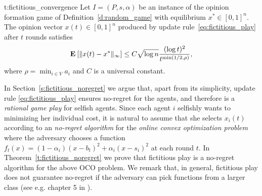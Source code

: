 %
\begin{reptheorem}{t:fictitious_convergence}
  Let $I = (P,s, \alpha)$ be an instance of the opinion formation
  game of Definition~\ref{d:random_game} with equilibrium
  $x^* \in [0,1]^n$.  The opinion vector $x(t)\in[0,1]^n$ produced by
  update rule~\ref{eq:fictitious_play} after $t$ rounds satisfies
  \[
    \bm{\mathrm{E}}_{} \left[ \| x(t) - x^* \|_{\infty} \right] \leq
    C \sqrt{\log n}\frac{(\log t)^{2}}{t^{\min(1/2,\rho)}},
  \]
  where $\rho = \min_{i \in V} a_i$ and $C$ is a universal constant.
\end{reptheorem}


In Section~\ref{s:fictitious_noregret} we argue that,
apart from its simplicity, update rule \ref{eq:fictitious_play} ensures
no-regret for the agents, and therefore is a \emph{rational game play} for selfish agents.
Since each agent $i$ selfishly wants to minimizing her individual cost,
it is natural to assume that she selects $x_i(t)$ according to
an \emph{no-regret algorithm} for the \emph{online convex optimization problem}
where the adversary chooses a function $f_t(x)=(1-\alpha_i)(x-b_t)^2 + \alpha_i(x-s_i)^2$
at each round $t$. In Theorem~\ref{t:fictitious_noregret}
we prove that fictitious play is a no-regret algorithm
for the above OCO problem. We remark that, in general,
fictitious play does not guarantee no-regret if the adversary can pick
functions from a larger class (see e.g. chapter 5 in \cite{Haz16}).


